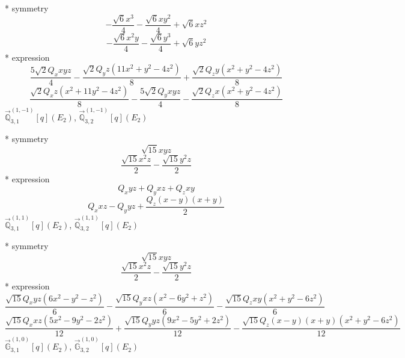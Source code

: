 \documentclass[fleqn,8pt]{jsarticle}
\begin{document}
\noindent\quad ** symmetry
\begin{dmath*}
- \frac{\sqrt{6} x^{3}}{4} - \frac{\sqrt{6} x y^{2}}{4} + \sqrt{6} x z^{2}
\end{dmath*}
\begin{dmath*}
- \frac{\sqrt{6} x^{2} y}{4} - \frac{\sqrt{6} y^{3}}{4} + \sqrt{6} y z^{2}
\end{dmath*}
\noindent\quad ** expression
\begin{dmath*}
\frac{5 \sqrt{2} Q_{x} x y z}{4} - \frac{\sqrt{2} Q_{y} z \left(11 x^{2} + y^{2} - 4 z^{2}\right)}{8} + \frac{\sqrt{2} Q_{z} y \left(x^{2} + y^{2} - 4 z^{2}\right)}{8}
\end{dmath*}
\begin{dmath*}
\frac{\sqrt{2} Q_{x} z \left(x^{2} + 11 y^{2} - 4 z^{2}\right)}{8} - \frac{5 \sqrt{2} Q_{y} x y z}{4} - \frac{\sqrt{2} Q_{z} x \left(x^{2} + y^{2} - 4 z^{2}\right)}{8}
\end{dmath*}
\noindent\quad $\vec{\mathbb{Q}}_{3,1}^{(1,-1)}[q](E_{2})$, $\vec{\mathbb{Q}}_{3,2}^{(1,-1)}[q](E_{2})$

\noindent\quad ** symmetry
\begin{dmath*}
\sqrt{15} x y z
\end{dmath*}
\begin{dmath*}
\frac{\sqrt{15} x^{2} z}{2} - \frac{\sqrt{15} y^{2} z}{2}
\end{dmath*}
\noindent\quad ** expression
\begin{dmath*}
Q_{x} y z + Q_{y} x z + Q_{z} x y
\end{dmath*}
\begin{dmath*}
Q_{x} x z - Q_{y} y z + \frac{Q_{z} \left(x - y\right) \left(x + y\right)}{2}
\end{dmath*}
\noindent\quad $\vec{\mathbb{Q}}_{3,1}^{(1,1)}[q](E_{2})$, $\vec{\mathbb{Q}}_{3,2}^{(1,1)}[q](E_{2})$

\noindent\quad ** symmetry
\begin{dmath*}
\sqrt{15} x y z
\end{dmath*}
\begin{dmath*}
\frac{\sqrt{15} x^{2} z}{2} - \frac{\sqrt{15} y^{2} z}{2}
\end{dmath*}
\noindent\quad ** expression
\begin{dmath*}
\frac{\sqrt{15} Q_{x} y z \left(6 x^{2} - y^{2} - z^{2}\right)}{6} - \frac{\sqrt{15} Q_{y} x z \left(x^{2} - 6 y^{2} + z^{2}\right)}{6} - \frac{\sqrt{15} Q_{z} x y \left(x^{2} + y^{2} - 6 z^{2}\right)}{6}
\end{dmath*}
\begin{dmath*}
\frac{\sqrt{15} Q_{x} x z \left(5 x^{2} - 9 y^{2} - 2 z^{2}\right)}{12} + \frac{\sqrt{15} Q_{y} y z \left(9 x^{2} - 5 y^{2} + 2 z^{2}\right)}{12} - \frac{\sqrt{15} Q_{z} \left(x - y\right) \left(x + y\right) \left(x^{2} + y^{2} - 6 z^{2}\right)}{12}
\end{dmath*}
\noindent\quad $\vec{\mathbb{G}}_{3,1}^{(1,0)}[q](E_{2})$, $\vec{\mathbb{G}}_{3,2}^{(1,0)}[q](E_{2})$
\end{document}
